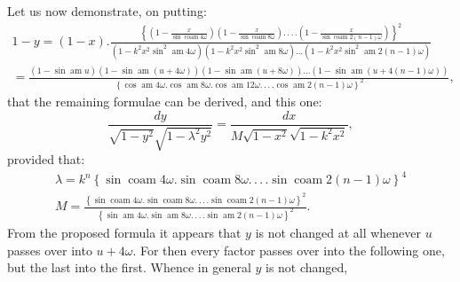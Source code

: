 \documentclass{article}
\begin{document}
Let us now demonstrate, on putting:
\[
\begin{gathered}
1-y=(1-x).\frac{\left\{\left(1-\frac{x}{\sin\operatorname{coam}4\omega}\right)\left(1-\frac{x}{\sin\operatorname{coam}8\omega}\right).\,.\,.\,.\left(1-\frac{x}{\sin\operatorname{coam}2(n-1)\omega}\right)\right\}^{2}}{\left(1-k^{2}x^{2}\sin^{2}\operatorname{am}4\omega\right)\left(1-k^{2}x^{2}\sin^{2}\operatorname{am}8\omega\right)\ldots\left(1-k^{2}x^{2}\sin^{2}\operatorname{am}2(n-1)\omega\right)}\\[1.5ex]
=\frac{\left(1-\sin\operatorname{am}u\right)\left(1-\sin\operatorname{am}(u+4\omega)\right)\left(1-\sin\operatorname{am}(u+8\omega)\right)\ldots\left(1-\sin\operatorname{am}(u+4(n-1)\omega)\right)}{\left\{\cos\operatorname{am}4\omega.\cos\operatorname{am}8\omega.\cos\operatorname{am}12\omega.\,.\,.\,.\cos\operatorname{am}2(n-1)\omega\right\}^{2}},
\end{gathered}
\]
that the remaining formulae can be derived, and this one:
\[
\frac{dy}{\sqrt{1-y^{2}}\sqrt{1-\lambda^{2}y^{2}}}=\frac{dx}{M\sqrt{1-x^{2}}\sqrt{1-k^{2}x^{2}}},
\]
provided that:
\[
\begin{gathered}
\lambda=k^{n}\left\{\sin\operatorname{coam}4\omega.\sin\operatorname{coam}8\omega.\,.\,.\,.\sin\operatorname{coam}2(n-1)\omega\right\}^{4}\\[1.5ex]
M=\frac{\left\{\sin\operatorname{coam}4\omega.\sin\operatorname{coam}8\omega.\,.\,.\,.\sin\operatorname{coam}2(n-1)\omega\right\}^{2}}{\left\{\sin\operatorname{am}4\omega.\sin\operatorname{am}8\omega.\,.\,.\,.\sin\operatorname{am}2(n-1)\omega\right\}^{2}}.
\end{gathered}
\]
From the proposed formula it appears that $y$ is not changed at all whenever $u$ passes over into $u+4\omega$. For then every factor passes over into the following one, but the last into the first. Whence in general $y$ is not changed,
\end{document}
